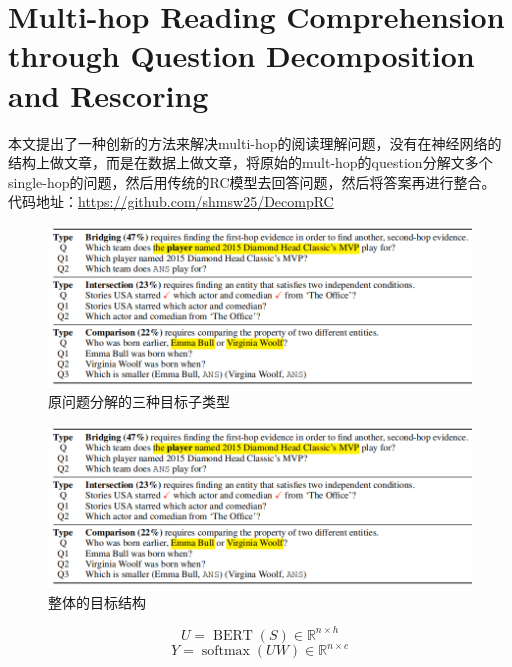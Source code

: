 \documentclass[a4paper,UTF8]{article}
\numberwithin{equation}{section}
\begin{document}
\section{Multi-hop Reading Comprehension
through Question Decomposition and Rescoring}
本文提出了一种创新的方法来解决multi-hop的阅读理解问题，没有在神经网络的结构上做文章，而是在数据上做文章，将原始的mult-hop的question分解文多个single-hop的问题，然后用传统的RC模型去回答问题，然后将答案再进行整合。
代码地址：\url{https://github.com/shmsw25/DecompRC}

\begin{figure}[H]
	\centering
	\includegraphics[width=\textwidth]{8-1.png}
	\caption{原问题分解的三种目标子类型}
\end{figure}
\begin{figure}[H]
	\centering
	\includegraphics[width=\textwidth]{8-1.png}
	\caption{整体的目标结构}
\end{figure}
\begin{equation}
	U=\operatorname{BERT}(S) \in \mathbb{R}^{n \times h}
	\end{equation}
	\begin{equation}
		Y=\operatorname{softmax}(U W) \in \mathbb{R}^{n \times c}
		\end{equation}
\end{document}
